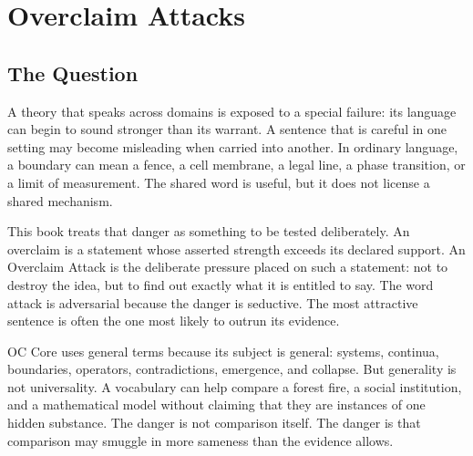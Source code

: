\documentclass[11pt,a4paper,openany]{book}
\begin{document}
\section{Overclaim Attacks}
\subsection{The Question}
A theory that speaks across domains is exposed to a special failure: its language can begin to sound stronger than its warrant. A sentence that is careful in one setting may become misleading when carried into another. In ordinary language, a boundary can mean a fence, a cell membrane, a legal line, a phase transition, or a limit of measurement. The shared word is useful, but it does not license a shared mechanism. \cite{grimmett_percolation,goldenfeld_lectures}\par
This book treats that danger as something to be tested deliberately. An overclaim is a statement whose asserted strength exceeds its declared support. An Overclaim Attack is the deliberate pressure placed on such a statement: not to destroy the idea, but to find out exactly what it is entitled to say. The word attack is adversarial because the danger is seductive. The most attractive sentence is often the one most likely to outrun its evidence.\par
OC Core uses general terms because its subject is general: systems, continua, boundaries, operators, contradictions, emergence, and collapse. But generality is not universality. A vocabulary can help compare a forest fire, a social institution, and a mathematical model without claiming that they are instances of one hidden substance. The danger is not comparison itself. The danger is that comparison may smuggle in more sameness than the evidence allows.\par
\end{document}
